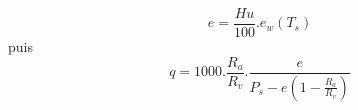 \[
  e = \frac{Hu}{100} . e_w(T_s)
\]
puis
\[
  q = 1000 . \frac{R_a}{R_v} . \frac{e}{P_s - e (1-\frac{R_a}{R_v})}
\]

